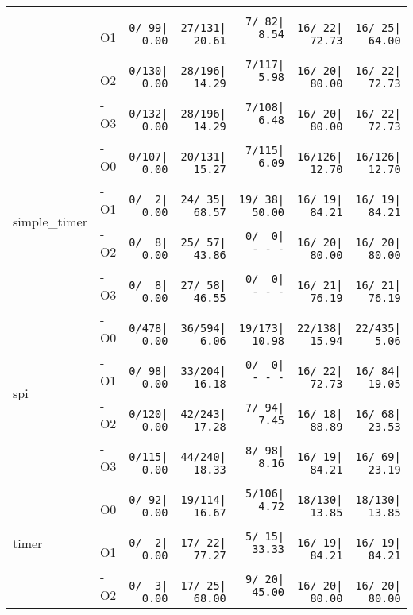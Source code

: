 \begin{tabular}{@{}llrrrrr@{}}
    & -O1 & \texttt{  0/~99|~~0.00} & \texttt{ 27/131|~20.61} & \texttt{  7/~82|~~8.54} & \texttt{ 16/~22|~72.73} & \texttt{ 16/~25|~64.00} \\
    & -O2 & \texttt{  0/130|~~0.00} & \texttt{ 28/196|~14.29} & \texttt{  7/117|~~5.98} & \texttt{ 16/~20|~80.00} & \texttt{ 16/~22|~72.73} \\
    & -O3 & \texttt{  0/132|~~0.00} & \texttt{ 28/196|~14.29} & \texttt{  7/108|~~6.48} & \texttt{ 16/~20|~80.00} & \texttt{ 16/~22|~72.73} \\ \midrule
\multirow{4}{*}{simple\_timer}
    & -O0 & \texttt{  0/107|~~0.00} & \texttt{ 20/131|~15.27} & \texttt{  7/115|~~6.09} & \texttt{ 16/126|~12.70} & \texttt{ 16/126|~12.70} \\
    & -O1 & \texttt{  0/~~2|~~0.00} & \texttt{ 24/~35|~68.57} & \texttt{ 19/~38|~50.00} & \texttt{ 16/~19|~84.21} & \texttt{ 16/~19|~84.21} \\
    & -O2 & \texttt{  0/~~8|~~0.00} & \texttt{ 25/~57|~43.86} & \texttt{  0/~~0|~-~-~-} & \texttt{ 16/~20|~80.00} & \texttt{ 16/~20|~80.00} \\
    & -O3 & \texttt{  0/~~8|~~0.00} & \texttt{ 27/~58|~46.55} & \texttt{  0/~~0|~-~-~-} & \texttt{ 16/~21|~76.19} & \texttt{ 16/~21|~76.19} \\ \midrule
\multirow{4}{*}{spi}
    & -O0 & \texttt{  0/478|~~0.00} & \texttt{ 36/594|~~6.06} & \texttt{ 19/173|~10.98} & \texttt{ 22/138|~15.94} & \texttt{ 22/435|~~5.06} \\
    & -O1 & \texttt{  0/~98|~~0.00} & \texttt{ 33/204|~16.18} & \texttt{  0/~~0|~-~-~-} & \texttt{ 16/~22|~72.73} & \texttt{ 16/~84|~19.05} \\
    & -O2 & \texttt{  0/120|~~0.00} & \texttt{ 42/243|~17.28} & \texttt{  7/~94|~~7.45} & \texttt{ 16/~18|~88.89} & \texttt{ 16/~68|~23.53} \\
    & -O3 & \texttt{  0/115|~~0.00} & \texttt{ 44/240|~18.33} & \texttt{  8/~98|~~8.16} & \texttt{ 16/~19|~84.21} & \texttt{ 16/~69|~23.19} \\ \midrule
\multirow{4}{*}{timer}
    & -O0 & \texttt{  0/~92|~~0.00} & \texttt{ 19/114|~16.67} & \texttt{  5/106|~~4.72} & \texttt{ 18/130|~13.85} & \texttt{ 18/130|~13.85} \\
    & -O1 & \texttt{  0/~~2|~~0.00} & \texttt{ 17/~22|~77.27} & \texttt{  5/~15|~33.33} & \texttt{ 16/~19|~84.21} & \texttt{ 16/~19|~84.21} \\
    & -O2 & \texttt{  0/~~3|~~0.00} & \texttt{ 17/~25|~68.00} & \texttt{  9/~20|~45.00} & \texttt{ 16/~20|~80.00} & \texttt{ 16/~20|~80.00} \\

\end{tabular}
